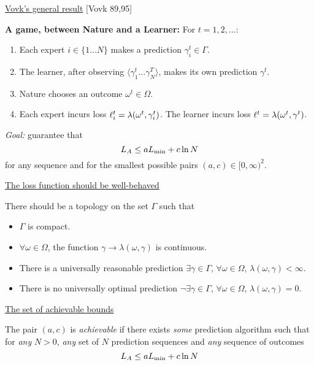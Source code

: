 \begin{flushleft}
\begin{LARGE}
\begin{center}
\underline{Vovk's general result}
[Vovk 89,95]
\end{center}

{\bf A game, between Nature and a Learner:}\newline
\newline
For $t=1,2,\ldots$:
\begin{enumerate}
\item
Each expert $i \in \{1 \ldots N \}$ makes a prediction 
$\gamma_i^t \in \Gamma$.
\item
The learner, after observing $\langle \gamma_1^t \ldots \gamma_N^T
\rangle$, makes its own prediction $\gamma^t$.
\item
Nature chooses an outcome $\omega^t \in \Omega$.
\item
Each expert incurs loss $\ell_{i}^{t} = \lambda(\omega^t,\gamma_i^t)$.
The learner incurs loss $\ell_{}^{t} = \lambda(\omega^t,\gamma^t)$.
\end{enumerate}

{\em Goal:} guarantee that 
\[ L_A \leq a L_{\min} + c \ln N \]
for any sequence and for the smallest possible pairs $(a,c) \in [0,\infty)^2$.
\pagebreak

\begin{center}
\underline{The loss function should be well-behaved}
\end{center}
There should be a topology on the set $\Gamma$ such that
\begin{itemize}
\item
$\Gamma$ is compact.
\item
$\forall \omega \in \Omega$, the function $\gamma \to
\lambda(\omega,\gamma)$ is continuous.
\item
There is a universally reasonable prediction
$\exists \gamma \in \Gamma$, $\forall \omega \in \Omega$,
$\lambda(\omega,\gamma) < \infty$.
\item
There is no universally optimal prediction
$\neg \exists \gamma \in \Gamma$, $\forall \omega \in \Omega$,
$\lambda(\omega,\gamma) = 0$.
\end{itemize}
\pagebreak

\begin{center}
\underline{The set of achievable bounds}
\end{center}
The pair $(a,c)$ is {\em achievable} if there exists 
{\em some} prediction algorithm
such that for {\em any} $N>0$, {\em any} set of $N$ prediction
sequences and {\em any} sequence of outcomes
\[
L_A \leq a L_{\min} + c \ln N
\]


\end{LARGE}
\end{flushleft}
